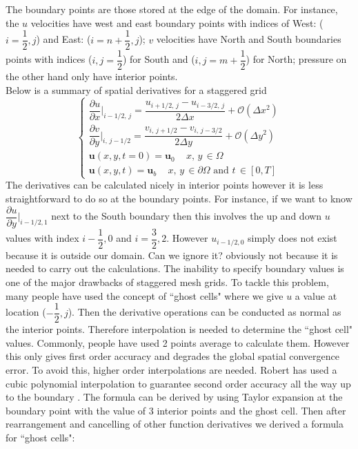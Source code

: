 The boundary points are those stored at the edge of the domain. For instance, the $u$ velocities have west and east boundary points with indices of West: ($i=\dfrac{1}{2},j$) and East: ($i=n+\dfrac{1}{2},j$); $v$ velocities have North and South boundaries points with indices ($i,j=\dfrac{1}{2}$) for South and ($i,j=m+\dfrac{1}{2}$) for North; pressure on the other hand only have interior points.\\
Below is a summary of spatial derivatives for a staggered grid
\begin{equation}
\begin{cases}
\dfrac{\partial u}{\partial x}|_{i-1/2,\,j} = \dfrac{u_{i+1/2,\,j} - u_{i-3/2,\,j}}{2\Delta x} + \mathcal{O}(\Delta x^2)\\
\dfrac{\partial v}{\partial y}|_{i,\,j-1/2} = \dfrac{v_{i,\,j+1/2} - v_{i,\,j-3/2}}{2\Delta y} + \mathcal{O}(\Delta y^2)\\
\textbf{u}(x,y,t=0) = \textbf{u}_0\,\,\,\text{   $x,\,y\,\in \Omega$}\\
\textbf{u}(x,y,t) = \textbf{u}_b\,\,\,\text{   $x,\,y\,\in \partial\Omega$ and $t\,\in [0,T]$}
\end{cases}
\end{equation} 
The derivatives can be calculated nicely in interior points however it is less straightforward to do so at the boundary points. For instance, if we want to know $\dfrac{\partial u}{\partial y}|_{i-1/2,1}$ next to the South boundary then this involves the up and down $u$ values with index $i-\dfrac{1}{2},0$ and $i=\dfrac{3}{2},2$. However $u_{i-1/2,0}$ simply does not exist because it is outside our domain. Can we ignore it? obviously not because it is needed to carry out the calculations. The inability to specify boundary values is one of the major drawbacks of staggered mesh grids. To tackle this problem, many people have used the concept of ``ghost cells" where we give $u$ a value at location ($-\dfrac{1}{2},j$). Then the derivative operations can be conducted as normal as the interior points. Therefore interpolation is needed to determine the ``ghost cell" values. Commonly, people have used 2 points average to calculate them. However this only gives first order accuracy and degrades the global spatial convergence error. To avoid this, higher order interpolations are needed. Robert has used a cubic polynomial interpolation to guarantee second order accuracy all the way up to the boundary \cite{sayenavierstokesmodule}. The formula can be derived by using Taylor expansion at the boundary point with the value of 3 interior points and the ghost cell. Then after rearrangement and cancelling of other function derivatives we derived a formula for ``ghost cells":\\
